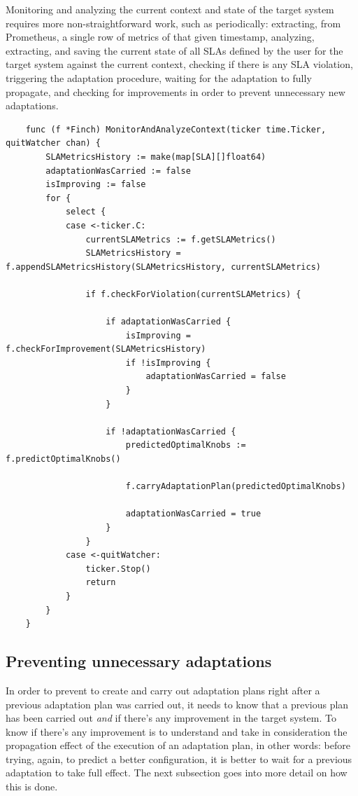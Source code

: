 \begin{appendices}
Monitoring and analyzing the current context and state of the target system requires more non-straightforward work, such as periodically: extracting, from Prometheus, a single row of metrics of that given timestamp, analyzing, extracting, and saving the current state of all SLAs defined by the user for the target system against the current context, checking if there is any SLA violation, triggering the adaptation procedure, waiting for the adaptation to fully propagate, and checking for improvements in order to prevent unnecessary new adaptations.

\lstset{aboveskip=20pt,belowskip=20pt}
\begin{lstlisting}
	func (f *Finch) MonitorAndAnalyzeContext(ticker time.Ticker, quitWatcher chan) {
		SLAMetricsHistory := make(map[SLA][]float64)
		adaptationWasCarried := false
		isImproving := false
		for {
			select {
			case <-ticker.C:
				currentSLAMetrics := f.getSLAMetrics()
				SLAMetricsHistory = f.appendSLAMetricsHistory(SLAMetricsHistory, currentSLAMetrics)

				if f.checkForViolation(currentSLAMetrics) {

					if adaptationWasCarried {
						isImproving = f.checkForImprovement(SLAMetricsHistory)
						if !isImproving {
							adaptationWasCarried = false
						}
					}

					if !adaptationWasCarried {
						predictedOptimalKnobs := f.predictOptimalKnobs()

						f.carryAdaptationPlan(predictedOptimalKnobs)

						adaptationWasCarried = true
					}
				}
			case <-quitWatcher:
				ticker.Stop()
				return
			}
		}
	}
\end{lstlisting}


\subsection{Preventing unnecessary adaptations}
In order to prevent \projectname{} to create and carry out adaptation plans right after a previous adaptation plan was carried out, it needs to know that a previous plan has been carried out \emph{and} if there's any improvement in the target system. To know if there's any improvement is to understand and take in consideration the propagation effect of the execution of an adaptation plan, in other words: before trying, again, to predict a better configuration, it is better to wait for a previous adaptation to take full effect. The next subsection goes into more detail on how this is done.


\end{appendices}
